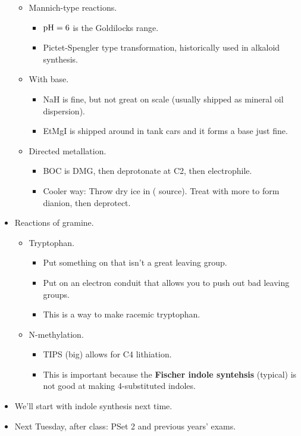 \documentclass[../notes.tex]{subfiles}
\begin{document}
\begin{itemize}
\begin{itemize}
\begin{itemize}
        \end{itemize}
        \item Mannich-type reactions.
        \begin{itemize}
            \item $\operatorname{\textup{pH}}=6$ is the Goldilocks range.
            \item Pictet-Spengler type transformation, historically used in alkaloid synthesis.
        \end{itemize}
        \item With base.
        \begin{itemize}
            \item NaH is fine, but not great on scale (usually shipped as mineral oil dispersion).
            \item EtMgI is shipped around in tank cars and it forms a base just fine.
        \end{itemize}
        \item Directed metallation.
        \begin{itemize}
            \item BOC is DMG, then deprotonate at C2, then electrophile.
            \item Cooler way: Throw dry ice in ( source). Treat with more to form dianion, then deprotect.
        \end{itemize}
    \end{itemize}
    \item Reactions of gramine.
    \begin{itemize}
        \item Tryptophan.
        \begin{itemize}
            \item Put something on that isn't a great leaving group.
            \item Put on an electron conduit that allows you to push out bad leaving groups.
            \item This is a way to make racemic tryptophan.
        \end{itemize}
        \item N-methylation.
        \begin{itemize}
            \item TIPS (big) allows for C4 lithiation.
            \item This is important because the \textbf{Fischer indole syntehsis} (typical) is not good at making 4-substituted indoles.
        \end{itemize}
    \end{itemize}
    \item We'll start with indole synthesis next time.
    \item Next Tuesday, after class: PSet 2 and previous years' exams.
\end{itemize}
\end{document}
